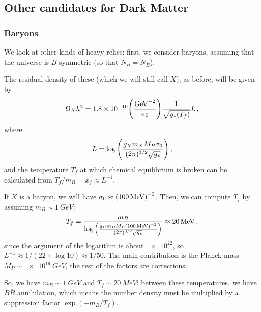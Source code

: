 \documentclass[main.tex]{subfiles}
\begin{document}
\subsection{Other candidates for Dark Matter}

\subsubsection{Baryons}


We look at other kinds of heavy relics: first, we consider baryons, assuming that the universe is \(B\)-symmetric (so that \(N_B = N_{\overline{B}}\)).

The residual density of these (which we will still call \(X\)), as before, will be given by 
%
\begin{align} \label{eq:estimate-X-particle-density-fraction}
\Omega_{X} h^2 = \num{1.8e-10} \qty(\frac{\SI{}{GeV^{-2}}}{\sigma_0 }) 
\frac{1}{\sqrt{g_* (T_f)}} L 
\,,
\end{align}
%
where 
%
\begin{align}
L = \log \qty(\frac{g_X m_X M_P \sigma_0 }{(2 \pi)^{3/2} \sqrt{g_*}})
\,,
\end{align}
%
and the temperature \(T_f\) at which chemical equilibrium is broken can be calculated from \(T_f / m_B = x_f \approx L^{-1}\). 

If \(X\) is a baryon, we will have \(\sigma_0 \approx \qty( \SI{100}{MeV})^{-2}\).
Then, we can compute \(T_f\) by assuming \(m_B \sim \SI{1}{GeV}\):  
%
\begin{align}
T_f = \frac{m_B}{\log \qty(\frac{g_B m_B M_P \qty(\SI{100}{MeV})^{-2}}{(2\pi )^{3/2} \sqrt{g_*}})} \approx \SI{20}{MeV}
\,,
\end{align}
%
since the argument of the logarithm is about \(\num{e22}\), so \(L^{-1} \approx 1 / (22 \times \log 10) \approx 1/50\).
The main contribution is the Planck mass \(M_P \sim \SI{e19}{GeV}\), the rest of the factors are corrections.

So, we have \(m_B \sim \SI{1}{GeV}\) and \(T_f \sim \SI{20}{MeV}\): 
between these temperatures, we have \(B \overline{B}\) annihilation, which means the number density must be multiplied by a suppression factor \(\exp( - m_B / T_f)\). 
\end{document}
